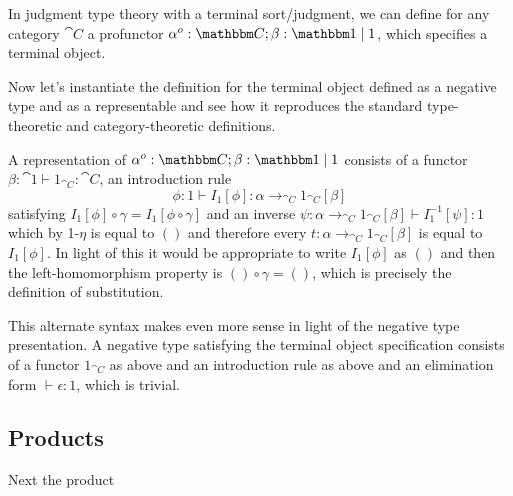 \documentclass{article}
\begin{document}
\begin{definition}
  In judgment type theory with a terminal sort/judgment, we can define
  for any category $\cat C$ a profunctor $\alpha^o:\cat C;\beta : \cat
  1 \pipe 1$, which specifies a terminal object.
\end{definition}

Now let's instantiate the definition for the terminal object defined
as a negative type and as a representable and see how it reproduces
the standard type-theoretic and category-theoretic definitions.

A representation of $\alpha^o:\cat C; \beta : \cat 1 \pipe 1$ consists
of a functor $\beta : \cat 1 \vdash 1_{\cat C} : \cat C$, an introduction rule
\[ \phi : 1 \vdash I_{1}[\phi] : \alpha \to_{\cat C} 1_{\cat C}[\beta] \]
satisfying $I_{1}[\phi] \circ \gamma =I_{1}[\phi \circ \gamma]$ and an
inverse $\psi : \alpha \to_{\cat C} 1_{\cat C}[\beta] \vdash
I_{1}^{-1}[\psi] : 1$ which by \textsc{1-$\eta$} is equal to $()$ and
therefore every $t : \alpha \to_{\cat C} 1_{\cat C}[\beta]$ is equal
to $I_{1}[\phi]$. In light of this it would be appropriate to write
$I_1[\phi]$ as $()$ and then the left-homomorphism property is $()
\circ \gamma = ()$, which is precisely the definition of substitution.

This alternate syntax makes even more sense in light of the negative
type presentation. A negative type satisfying the terminal object
specification consists of a functor $1_{\cat C}$ as above and an
introduction rule as above and an elimination form $\vdash \epsilon :
1$, which is trivial.

\subsection{Products}

Next the product
\end{document}
